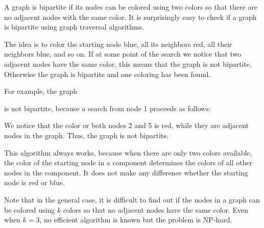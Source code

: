 
A graph is bipartite if its nodes can be colored
using two colors so that there are no adjacent
nodes with the same color.
It is surprisingly easy to check if a graph
is bipartite using graph traversal algorithms.

The idea is to color the starting node blue,
all its neighbors red, all their neighbors blue, and so on.
If at some point of the search we notice that
two adjacent nodes have the same color,
this means that the graph is not bipartite.
Otherwise the graph is bipartite and one coloring
has been found.

For example, the graph
\begin{center}
\end{center}
is not bipartite, because a search from node 1
proceeds as follows:
\begin{center}
\end{center}
We notice that the color or both nodes 2 and 5
is red, while they are adjacent nodes in the graph.
Thus, the graph is not bipartite.

This algorithm always works, because when there
are only two colors available,
the color of the starting node in a component
determines the colors of all other nodes in the component.
It does not make any difference whether the
starting node is red or blue.

Note that in the general case,
it is difficult to find out if the nodes
in a graph can be colored using $k$ colors
so that no adjacent nodes have the same color.
Even when $k=3$, no efficient algorithm is known
but the problem is NP-hard.
